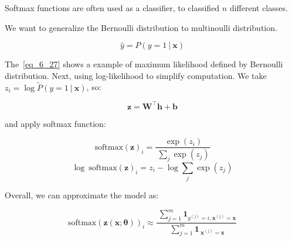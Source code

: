 %
%
%
%
%
%

  Softmax functions are often used as a classifier, to classified $n$ different classes.

  We want to generalize the Bernoulli distribution to multinoulli distribution.

  \begin{equation} \tag{6.27}
    \label{eq_6_27}
    \hat{y} = P( y=1\ |\ \bm{x} )
  \end{equation}

  The~\eqref{eq_6_27} shows a example of maximum likelihood defined by Bernoulli distribution.
  Next, using log-likelihood to simplify computation. We take $z _ i = \log \tilde{P}( y=1\ |\ \bm{x} )$, so:

  \begin{equation} \tag{6.28}
    \label{eq_6_28}
    \bm{z} = \bm{W} ^ \top \bm{h} + \bm{b}
  \end{equation}

  and apply softmax function:

  \begin{equation} \tag{6.29}
    \label{eq_6_29}
    \mathrm{softmax}{( \bm{z} )} _ i = \frac{\ \exp(z_i) } {\ \sum _ j \exp(z_j) }
  \end{equation}
  \begin{equation} \tag{6.30}
    \label{eq_6_30}
    \log\ \mathrm{softmax}{( \bm{z} )} _ i = z_i - \log \sum _ j \exp(z_j)
  \end{equation}

  Overall, we can approximate the model as:

  \begin{equation} \tag{6.31}
    \label{eq_6_31}
    \mathrm{softmax}{( \bm{z}( \bm{x};\bm{\theta} ) )} _ i \approx
      \frac{\ \sum ^ m _ {j=1} \bm{1} _ {y ^ {(j)} = i, \bm{x} ^ {(j)} = \bm{x}} }
        {\ \sum ^ m _ {j=1} \bm{1} _ {\ \bm{x} ^ {(j)} = \bm{x}} }
  \end{equation}

